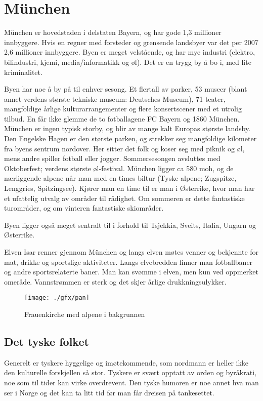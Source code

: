 \chapter{München}

München er hovedstaden i delstaten Bayern, og har gode 1,3 millioner innbyggere. Hvis en regner med forsteder og grensende landsbyer var det per 2007 2,6 millioner innbyggere. Byen er meget velstående, og har mye industri (elektro, bilindustri, kjemi, media/informatikk og øl). Det er en trygg by å bo i, med lite kriminalitet. 

Byen har noe å by på til enhver sesong. Et flertall av parker, 53 museer (blant annet verdens største tekniske museum: Deutsches Museum), 71 teater, mangfoldige årlige kulturarrangementer og flere konsertscener med et utrolig tilbud. En får ikke glemme de to fotballagene FC Bayern og 1860 München. München er ingen typisk storby, og blir av mange kalt Europas største landsby. Den Engelske Hagen er den største parken, og strekker seg mangfoldige kilometer fra byens sentrum nordover. Her sitter det folk og koser seg med piknik og øl, mens andre spiller fotball eller jogger. Sommersesongen avsluttes med Oktoberfest; verdens største øl-festival.
München ligger ca 580 moh, og de nærliggende alpene når man med en times biltur (Tyske alpene; Zugspitze, Lenggries, Spitzingsee). Kjører man en time til er man i Østerrike, hvor man har et ufattelig utvalg av områder til rådighet. Om sommeren er dette fantastiske turområder, og om vinteren fantastiske skiområder.


Byen ligger også meget sentralt til i forhold til Tsjekkia, Sveits, Italia, Ungarn og Østerrike. 

Elven Isar renner gjennom München og langs elven møtes venner og bekjennte for mat, drikke og sportslige aktiviteter. Langs elvebredden finner man fotballbaner og andre sportsrelaterte baner. Man kan svømme i elven, men kun ved oppmerket omeråde. Vannstrømmen er sterk og det skjer årlige drukkningsulykker. 


\begin{figure}[h]
\center
\texttt{[image: ./gfx/pan]}
\caption{Frauenkirche med alpene i bakgrunnen}
\end{figure}




\section{Det tyske folket}
Generelt er tyskere hyggelige og imøtekommende, som nordmann er heller ikke den kulturelle forskjellen så stor. Tyskere er svært opptatt av orden og byråkrati, noe som til tider kan virke overdrevent. Den tyske humoren er noe annet hva man ser i Norge og det kan ta litt tid før man får dreisen på tankesettet. 

